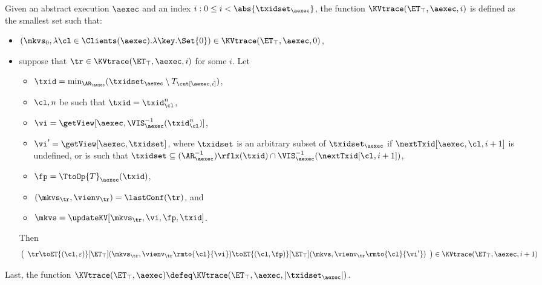 \begin{definition}
\label{def:aexec2kvtrace}
Given an abstract execution $\aexec$ and an index $i : 0 \leq i < \abs{\txidset_\aexec}$, 
the function $\KVtrace(\ET_{\top}, \aexec, i)$ is defined as the smallest set such that:
\begin{itemize}
\item 
$(\mkvs_{0}, \lambda \cl \in \Clients(\aexec). \lambda \key.\Set{0}) \in \KVtrace(\ET_{\top}, \aexec, 0)$, 
\item suppose that $\tr \in \KVtrace(\ET_{\top}, \aexec, i)$ for some $i$.  
Let
\begin{itemize} 
\item $\txid = \min_{\AR_{\aexec}}(\txidset_{\aexec} \setminus T_{\cut[\aexec, i]})$, 
\item  $\cl, n$ be such that $\txid = \txid_{\cl}^{n}$, 
\item  $\vi = \getView[\aexec, \VIS^{-1}_{\aexec}(\txid_{\cl}^{n})]$, 
\item $\vi' = \getView[\aexec, \txidset]$, where $\txidset$ is an arbitrary subset of $\txidset_{\aexec}$ if 
$\nextTxid[\aexec, \cl, i+1]$ is undefined, or is such that 
$\txidset \subseteq (\AR_{\aexec}^{-1})\rflx(\txid) \cap \VIS^{-1}_{\aexec}(\nextTxid[\cl, i+1])$, 
\item $\fp = \TtoOp{T}_{\aexec}(\txid)$, 
\item $(\mkvs_{\tr}, \vienv_{\tr}) = \lastConf(\tr)$, and
\item $\mkvs = \updateKV[\mkvs_{\tr}, \vi, \fp, \txid]$.
\end{itemize}
Then
\[
\left( 
\begin{array}{l}
\tr \toET{(\cl, \varepsilon)}[\ET_{\top}] (\mkvs_{\tr}, \vienv_{\tr}\rmto{\cl}{\vi}) 
\toET{(\cl, \fp)}[\ET_{\top}] (\mkvs, \vienv_{\tr}\rmto{\cl}{\vi'}) 
\end{array}
\right) \in \KVtrace(\ET_{\top}, \aexec, i+1)
\]
\end{itemize}
Last, the function $\KVtrace(\ET_{\top}, \aexec) \defeq \KVtrace(\ET_{\top}, \aexec, \lvert \txidset_\aexec \rvert)$.
\end{definition}

